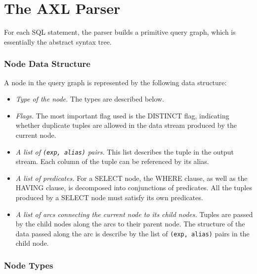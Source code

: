 \section{The AXL Parser}

For each SQL statement, the parser builds a primitive query graph,
which is essentially the abstract syntax tree.

\subsubsection*{Node Data Structure} 
A node in the query graph is represented by the following data
structure:
\begin{itemize}
\item {\it Type of the node.} The types are described below.
\item {\it Flags.} The most important flag used is the DISTINCT flag,
  indicating whether duplicate tuples are allowed in the data stream
  produced by the current node.
\item {\it A list of {\tt (exp, alias)} pairs.} This list describes
  the tuple in the output stream. Each column of the tuple can be
  referenced by its alias.
\item {\it A list of predicates.}  For a SELECT node, the WHERE
  clause, as well as the HAVING clause, is decomposed into
  conjunctions of predicates.  All the tuples produced by a SELECT
  node must satisfy its own predicates. 
\item {\it A list of arcs connecting the current node to its child
    nodes.}  Tuples are passed by the child nodes along the arcs to
  their parent node. The structure of the data passed along the arc
  is describe by the list of {\tt (exp, alias)} pairs in the child
  node.
\end{itemize}

\subsubsection*{Node Types} 

